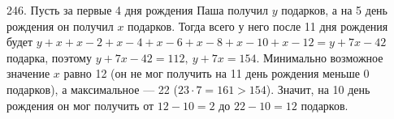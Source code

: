 246. Пусть за первые 4 дня рождения Паша получил $y$ подарков, а на 5 день рождения он получил $x$ подарков. Тогда всего у него после 11 дня рождения будет $y+x+x-2+x-4+x-6+x-8+x-10+x-12=y+7x-42$ подарка, поэтому $y+7x-42=112,\ y+7x=154.$ Минимально возможное значение $x$ равно 12 (он не мог получить на 11 день рождения меньше 0 подарков), а максимальное --- 22 ($23\cdot7=161>154$). Значит, на 10 день рождения он мог получить от $12-10=2$ до $22-10=12$ подарков.\\
